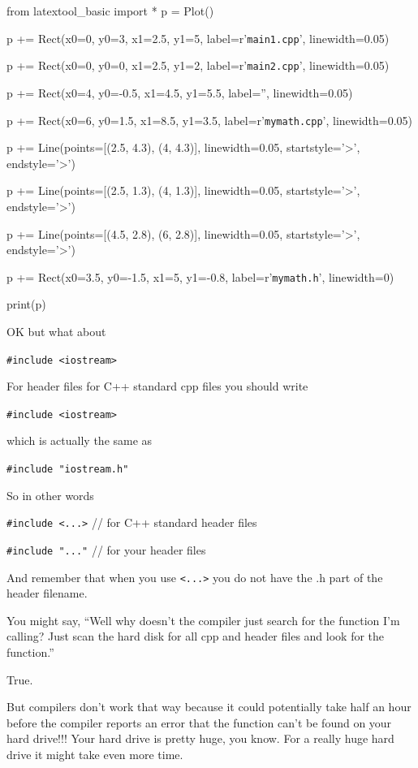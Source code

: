 \begin{python}
from latextool_basic import *
p = Plot()

p += Rect(x0=0, y0=3, x1=2.5, y1=5, label=r'{\tt main1.cpp}', linewidth=0.05)

p += Rect(x0=0, y0=0, x1=2.5, y1=2, label=r'{\tt main2.cpp}', linewidth=0.05)

p += Rect(x0=4, y0=-0.5, x1=4.5, y1=5.5, label='', linewidth=0.05)

p += Rect(x0=6, y0=1.5, x1=8.5, y1=3.5, label=r'{\tt mymath.cpp}', linewidth=0.05)

p += Line(points=[(2.5, 4.3), (4, 4.3)], linewidth=0.05, startstyle='>', endstyle='>')

p += Line(points=[(2.5, 1.3), (4, 1.3)], linewidth=0.05, startstyle='>', endstyle='>')

p += Line(points=[(4.5, 2.8), (6, 2.8)], linewidth=0.05, startstyle='>', endstyle='>')

p += Rect(x0=3.5, y0=-1.5, x1=5, y1=-0.8, label=r'{\tt mymath.h}', linewidth=0)

print(p)
\end{python}

OK but what about

\verb!#include <iostream>!

For header files for C++ standard cpp files you should write

\verb!#include <iostream>!

which is actually the same as

\verb!#include "iostream.h"!

So in other words

\verb!#include <...>! // for C++ standard header files

\verb!#include "..."! // for your header files

And remember that when you use \verb!<...>! you do not
have the .h part of the header filename.

You might say, ``Well why doesn't the compiler just
search for the function I'm calling? Just scan the hard
disk for all cpp and header files and look for the function.''

True.

But compilers don't work that way because it could
potentially take half an hour before the compiler reports an error that
the function can't be found on your hard drive!!! Your
hard drive is pretty huge, you know. For a really huge hard drive it
might take even more time.

